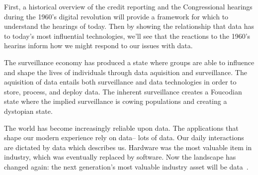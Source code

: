 First, a historical overview of the credit reporting and the Congressional
hearings during the 1960's digital revolution will provide a framework for
which to understand the hearings of today. Then by showing the relationship
that data has to today's most influential technologies, we'll see that the
reactions to the 1960's hearins inform how we might respond to our issues with
data.


The surveillance economy has produced a state where groups are able to
influence and shape the lives of individuals through data aquisition and
surveillance. The aquisition of data entails both surveillance and data
technologies in order to store, process, and deploy data. The inherent
surveillance creates a Foucodian state where the implied surveillance is cowing
populations and creating a dystopian state.

The world has become increasingly reliable upon data. The applications that
shape our modern experience rely on data-- lots of data. Our daily interactions
are dictated by data which describes us. Hardware was the most valuable item in
industry, which was eventually replaced by software. Now the landscape has
changed again: the next generation's most valuable industry asset will be
data~\cite{janeway2018doing}.





